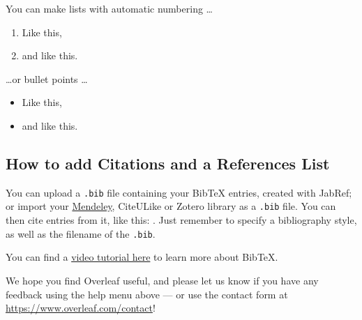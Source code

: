 \documentclass[a4paper]{article}
\begin{document}
You can make lists with automatic numbering \dots

\begin{enumerate}
\item Like this,
\item and like this.
\end{enumerate}
\dots or bullet points \dots
\begin{itemize}
\item Like this,
\item and like this.
\end{itemize}

\subsection{How to add Citations and a References List}

You can upload a \verb|.bib| file containing your BibTeX entries, created with JabRef; or import your \href{https://www.overleaf.com/blog/184}{Mendeley}, CiteULike or Zotero library as a \verb|.bib| file. You can then cite entries from it, like this: \cite{greenwade93}. Just remember to specify a bibliography style, as well as the filename of the \verb|.bib|.

You can find a \href{https://www.overleaf.com/help/97-how-to-include-a-bibliography-using-bibtex}{video tutorial here} to learn more about BibTeX.

We hope you find Overleaf useful, and please let us know if you have any feedback using the help menu above --- or use the contact form at \url{https://www.overleaf.com/contact}!



\end{document}
